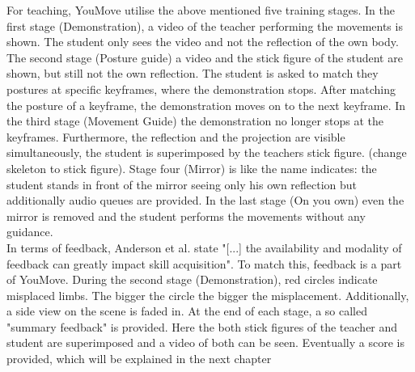 For teaching, YouMove utilise the above mentioned five training stages. In the first stage (Demonstration), a video of the teacher performing the movements is shown. The student only sees the video and not the reflection of the own body. The second stage (Posture guide) a video and the stick figure of the student are shown, but still not the own reflection. The student is asked to match they postures at specific keyframes, where the demonstration stops. After matching the posture of a keyframe, the demonstration moves on to the next keyframe. In the third stage (Movement Guide) the demonstration no longer stops at the keyframes. Furthermore, the reflection and the projection are visible simultaneously, the student is superimposed by the teachers stick figure. (\todo change skeleton to stick figure). Stage four (Mirror) is like the name indicates: the student stands in front of the mirror seeing only his own reflection but additionally audio queues are provided. In the last stage (On you own) even the mirror is removed and the student performs the movements without any guidance.\\
In terms of feedback, Anderson et al. state "[...] the availability and modality of feedback can greatly impact skill acquisition". To match this, feedback is a part of YouMove. During the second stage (Demonstration), red circles indicate misplaced limbs. The bigger the circle the bigger the misplacement. Additionally, a side view on the scene is faded in. At the end of each stage, a so called "summary feedback" is provided. Here the both stick figures of the teacher and student are superimposed and a video of both can be seen. Eventually a score is provided, which will be explained in the next chapter



